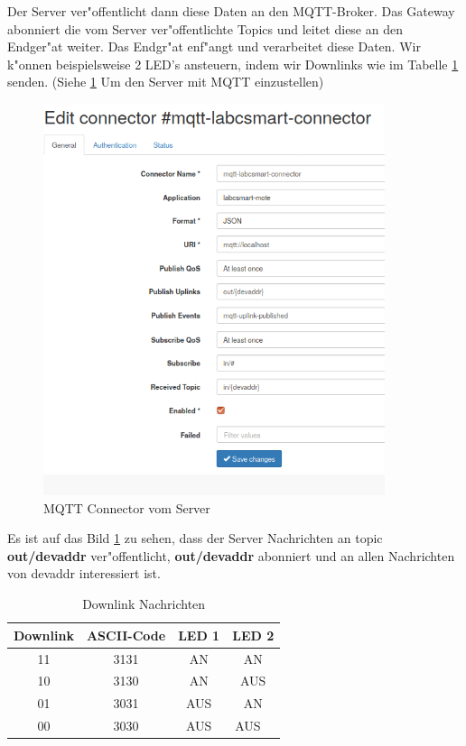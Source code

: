 Der Server ver"offentlicht dann diese Daten an den MQTT-Broker. Das Gateway abonniert 
die vom Server ver"offentlichte Topics und leitet diese an den Endger"at weiter. Das 
Endgr"at enf"angt und verarbeitet diese Daten. Wir k"onnen beispielsweise 2 LED's ansteuern, 
indem wir Downlinks wie im Tabelle \ref{tab:Downlink} senden. (Siehe 
\ref{fig:mqtt-Connector} Um den Server mit MQTT einzustellen) 

\begin{figure}[h]
	\centering
	\includegraphics[width=10cm]{source/images/Labcsmart_connector}
	\caption{MQTT Connector vom Server\label{fig:mqtt-Connector}}
\end{figure}

\vspace{1cm}
Es ist auf das Bild \ref{fig:mqtt-Connector} zu sehen, dass der Server Nachrichten an topic \textbf{out/{devaddr}} ver"offentlicht, \textbf{out/{devaddr}} abonniert  und an allen Nachrichten von devaddr interessiert ist. 


\begin{center}
	\begin{table}[htbp] 
		\centering 
		\Large
		\begin{tabular}{c|c|c|c}
			
			\textbf{Downlink} & \textbf{ASCII-Code} & \textbf{LED 1} & \textbf{LED 2} \\
			\hline
			11 & 3131	& AN & AN \\
			\hline
			10 & 3130	& AN & AUS \\
			\hline
			01 & 3031	& AUS & AN \\
			\hline
			00 & 3030  & AUS & AUS \
		\end{tabular} 
		\caption{Downlink Nachrichten} 
		\label{tab:Downlink} 
	\end{table}
\end{center}

